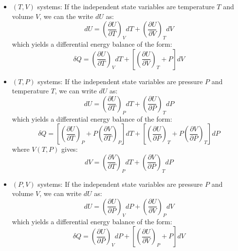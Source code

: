 \documentclass[11pt]{article}
\theoremstyle{definition}
\begin{document}
\begin{itemize}
	\item{$\left(T,V\right)$ systems: If the independent state variables are temperature $T$ and volume $V$, we can the write $dU$ as:
	\begin{equation}
		dU = \left(\frac{\partial{U}}{\partial{T}}\right)_{V}dT + \left(\frac{\partial{U}}{\partial{V}}\right)_{T}dV
	\end{equation}which yields a differential energy balance of the form:
	\begin{equation}\label{eqn:T-V-N-system}
		\delta{Q} = \left(\frac{\partial{U}}{\partial{T}}\right)_{V}dT + \left[\left(\frac{\partial{U}}{\partial{V}}\right)_{T} + P\right]dV
	\end{equation}}

	\item{$\left(T,P\right)$ systems: If the independent state variables are pressure $P$ and temperature $T$, we can write $dU$ as:
	\begin{equation}
		dU = \left(\frac{\partial{U}}{\partial{T}}\right)_{P}dT + \left(\frac{\partial{U}}{\partial{P}}\right)_{T}dP
	\end{equation}which yields a differential energy balance of the form:
	\begin{equation}\label{eqn:T-P-N-system}
		\delta{Q} = \left[\left(\frac{\partial{U}}{\partial{T}}\right)_{P}+P\left(\frac{\partial{V}}{\partial{T}}\right)_{P}\right]dT +
		\left[\left(\frac{\partial{U}}{\partial{P}}\right)_{T} + P\left(\frac{\partial{V}}{\partial{P}}\right)_{T}\right]dP
	\end{equation}where $V\left(T,P\right)$ gives:
	\begin{equation}
		dV = \left(\frac{\partial{V}}{\partial{T}}\right)_{P}dT+\left(\frac{\partial{V}}{\partial{P}}\right)_{T}dP
	\end{equation}}

	\item{$\left(P,V\right)$ systems: If the independent state variables are pressure $P$ and volume $V$, we can write $dU$ as:
	\begin{equation}
		dU = \left(\frac{\partial{U}}{\partial{P}}\right)_{V}dP + \left(\frac{\partial{U}}{\partial{V}}\right)_{P}dV
	\end{equation}which yields a differential energy balance of the form:
	\begin{equation}
		\delta{Q} = \left(\frac{\partial{U}}{\partial{P}}\right)_{V}dP + \left[\left(\frac{\partial{U}}{\partial{V}}\right)_{P} + P\right]dV
	\end{equation}}

\end{itemize}
\end{document}
